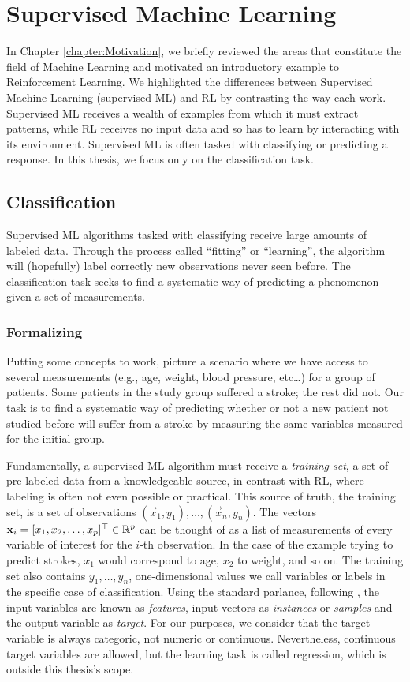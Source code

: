 \chapter{Supervised Machine Learning}
\label{chapter:SupervisedLearning}

In Chapter \ref{chapter:Motivation}, we briefly reviewed the areas that
constitute the field of Machine Learning and motivated an introductory example
to Reinforcement Learning. We highlighted the differences between Supervised
Machine Learning (supervised ML) and RL by contrasting the way each work.
Supervised ML receives a wealth of examples from which it must extract patterns,
while RL receives no input data and so has to learn by interacting with its
environment. Supervised ML is often tasked with classifying or predicting a
response. In this thesis, we focus only on the classification task.

\section{Classification}
Supervised ML algorithms tasked with classifying receive large amounts of
labeled data. Through the process called ``fitting'' or ``learning'', the
algorithm will (hopefully) label correctly new observations never seen before.
The classification task seeks to find a systematic way of predicting a
phenomenon given a set of measurements.

\subsection{Formalizing}
Putting some concepts to work, picture a scenario where we have access to
several measurements (e.g., age, weight, blood pressure, etc\dots) for a group
of patients. Some patients in the study group suffered a stroke; the rest did
not. Our task is to find a systematic way of predicting whether or not a new
patient not studied before will suffer from a stroke by measuring the same
variables measured for the initial group.

Fundamentally, a supervised ML algorithm must receive a \textit{training set}, a
set of pre-labeled data from a knowledgeable source, in contrast with RL, where
labeling is often not even possible or practical. This source of truth, the
training set, is a set of observations $(\vec{x}_1, y_1), \dots, (\vec{x}_n,
y_n)$. The vectors $\mathbf{x}_i = [x_1, x_2, \dots, x_p]^{\top} \in \mathbb{R}^{p}$ can be
thought of as a list of measurements of every variable of interest for the
$i$-th observation. In the case of the example trying to predict strokes, $x_1$
would correspond to age, $x_2$ to weight, and so on. The training set also
contains $y_1, \dots, y_n$, one-dimensional values we call variables or labels
in the specific case of classification. Using the standard parlance, following
\cite{louppe2014}, the input variables are known as \textit{features}, input
vectors as \textit{instances} or \textit{samples} and the output variable as
\textit{target}. For our purposes, we consider that the target variable is
always categoric, not numeric or continuous. Nevertheless, continuous target
variables are allowed, but the learning task is called regression, which is
outside this thesis's scope.


